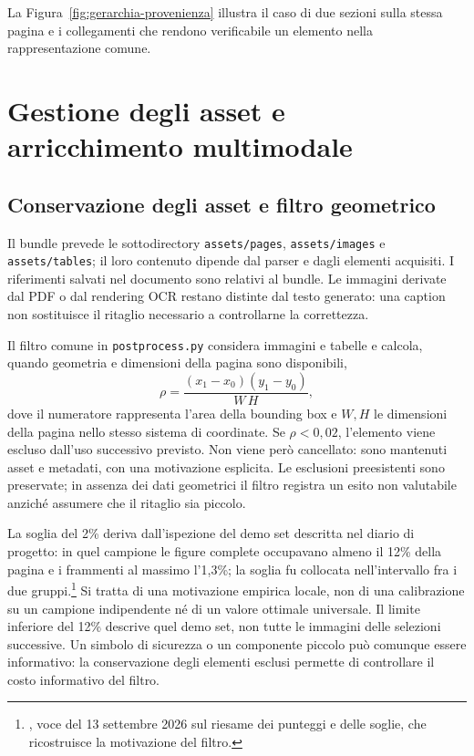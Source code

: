 La Figura~\ref{fig:gerarchia-provenienza} illustra il caso di due sezioni sulla stessa pagina e i collegamenti che rendono verificabile un elemento nella rappresentazione comune.



\section{Gestione degli asset e arricchimento multimodale}
\label{sec:asset}
\label{sec:enrichment-metodo}

\subsection{Conservazione degli asset e filtro geometrico}

Il bundle prevede le sottodirectory \texttt{assets/pages}, \texttt{assets/images} e \texttt{assets/tables}; il loro contenuto dipende dal parser e dagli elementi acquisiti. I riferimenti salvati nel documento sono relativi al bundle. Le immagini derivate dal PDF o dal rendering OCR restano distinte dal testo generato: una caption non sostituisce il ritaglio necessario a controllarne la correttezza.

Il filtro comune in \texttt{postprocess.py} considera immagini e tabelle e calcola, quando geometria e dimensioni della pagina sono disponibili,
\begin{equation}
    \rho=\frac{(x_1-x_0)(y_1-y_0)}{W\,H},
\end{equation}
dove il numeratore rappresenta l'area della bounding box e $W,H$ le dimensioni della pagina nello stesso sistema di coordinate. Se $\rho<0{,}02$, l'elemento viene escluso dall'uso successivo previsto. Non viene però cancellato: sono mantenuti asset e metadati, con una motivazione esplicita. Le esclusioni preesistenti sono preservate; in assenza dei dati geometrici il filtro registra un esito non valutabile anziché assumere che il ritaglio sia piccolo.

La soglia del 2\% deriva dall'ispezione del demo set descritta nel diario di progetto: in quel campione le figure complete occupavano almeno il 12\% della pagina e i frammenti al massimo l'1,3\%; la soglia fu collocata nell'intervallo fra i due gruppi.\footnote{, voce del 13 settembre 2026 sul riesame dei punteggi e delle soglie, che ricostruisce la motivazione del filtro.} Si tratta di una motivazione empirica locale, non di una calibrazione su un campione indipendente né di un valore ottimale universale. Il limite inferiore del 12\% descrive quel demo set, non tutte le immagini delle selezioni successive. Un simbolo di sicurezza o un componente piccolo può comunque essere informativo: la conservazione degli elementi esclusi permette di controllare il costo informativo del filtro.


